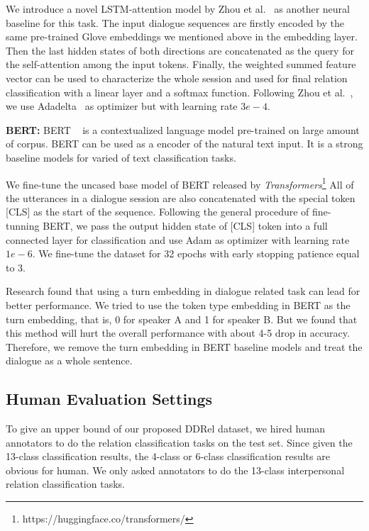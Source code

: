 We introduce a novel LSTM-attention model by Zhou et al.~\cite{ZhouSTQLHX16} as another
neural baseline for this task.
The input dialogue sequences are firstly encoded by the same pre-trained Glove embeddings 
we mentioned above in the embedding layer. Then the last hidden states of both directions 
are concatenated as the query for the self-attention among the input tokens. Finally, the weighted summed 
feature vector can be used to characterize the whole session and used for final relation 
classification with a linear layer and a softmax function. Following Zhou et al.~\cite{ZhouSTQLHX16},
we use Adadelta~\cite{DBLP:adadelta} as optimizer but with learning rate $3e-4$.

\textbf{BERT:}
BERT ~\cite{DevlinCLT19} is a contextualized language model pre-trained on large amount of corpus.
BERT can be used as a encoder of the natural text input.
It is a strong baseline models for varied of text classification tasks.

We fine-tune the uncased base model of BERT released by \textit{Transformers}\footnote{https://huggingface.co/transformers/}
All of the utterances in a dialogue session 
are also concatenated with the special token [CLS] as the start of the sequence.
Following the general procedure of fine-tunning BERT, we pass the output hidden state of 
[CLS] token into a full connected layer for classification and use Adam as optimizer
with learning rate $1e-6$. We fine-tune the dataset for 32 epochs with early stopping
patience equal to 3.

Research found that using a turn embedding in dialogue related task can lead for better performance.
We tried to use the token type embedding in BERT as the turn embedding, that is, 0 for speaker A
and 1 for speaker B. But we found that this method will hurt the overall performance with about
4-5 drop in accuracy. Therefore, we remove the turn embedding in BERT baseline models and treat
the dialogue as a whole sentence.

\subsection{Human Evaluation Settings}

To give an upper bound of our proposed DDRel dataset, we hired human annotators to do the relation classification tasks on the test set. Since given the 13-class classification results, the 4-class or 6-class classification results are obvious for human. We only asked annotators to do the 13-class interpersonal relation classification tasks.

